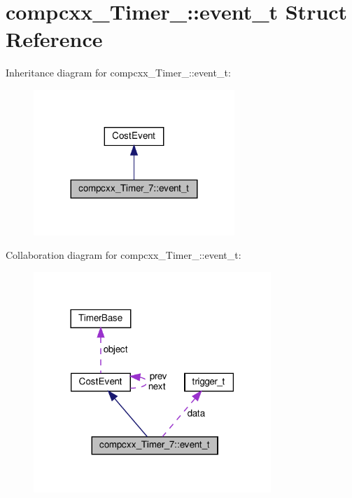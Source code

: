\hypertarget{structcompcxx__Timer__7_1_1event__t}{}\section{compcxx\+\_\+\+Timer\+\_\+:\+:event\+\_\+t Struct Reference}
\label{structcompcxx__Timer__7_1_1event__t}


Inheritance diagram for compcxx\+\_\+\+Timer\+\_\+:\+:event\+\_\+t\+:\nopagebreak
\begin{figure}[H]
\begin{center}
\leavevmode
\includegraphics[width=215pt]{structcompcxx__Timer__7_1_1event__t__inherit__graph}
\end{center}
\end{figure}


Collaboration diagram for compcxx\+\_\+\+Timer\+\_\+:\+:event\+\_\+t\+:\nopagebreak
\begin{figure}[H]
\begin{center}
\leavevmode
\includegraphics[width=254pt]{structcompcxx__Timer__7_1_1event__t__coll__graph}
\end{center}
\end{figure}
